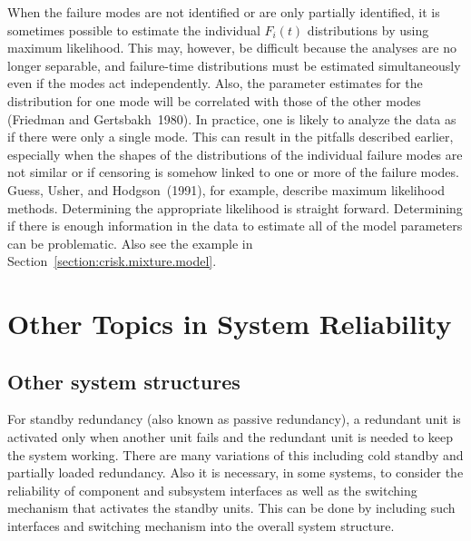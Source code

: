 When the failure modes are not identified or are only partially
identified, it is sometimes possible to estimate the individual
$F_{i}(t)$ distributions by using maximum likelihood.  This may,
however, be difficult because the analyses are no longer separable,
and failure-time distributions must be estimated simultaneously
even if the modes act independently.  Also, the parameter estimates
for the distribution for one mode will be correlated with those of the
other modes (Friedman and Gertsbakh~1980).  In practice, one is
likely to analyze the data as if there were only a single mode.  This
can result in the pitfalls described earlier, especially when the
shapes of the distributions of the individual failure modes are not
similar or if censoring is somehow linked to one or more of the
failure modes. Guess, Usher,  and Hodgson~(1991), for example,
describe maximum likelihood methods. Determining the
appropriate likelihood is straight forward. Determining if
there is enough information in the data to estimate
all of the model parameters can be problematic. Also see the example
in Section~\ref{section:crisk.mixture.model}.

\section{Other Topics in System Reliability}
\label{section:other.sys.rel.topics}
\subsection{Other system structures}
For standby redundancy (also known as passive redundancy), a redundant
unit is activated only when another unit fails and the redundant unit
is needed to keep the system working.
There are many variations of this including cold standby and
partially loaded redundancy. Also it is necessary, in some systems,
to consider the reliability of component and subsystem interfaces
as well as the switching mechanism that activates the 
standby units. This can be done by including such interfaces and
switching mechanism into the overall system structure.

